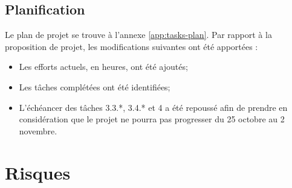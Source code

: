\documentclass[a4paper, oneside, 12pt, titlepage]{article}
\begin{document}
\subsection{Planification}


Le plan de projet se trouve à l'annexe \ref{app:tasks-plan}. Par rapport à la proposition de projet,
les modifications suivantes ont été apportées :

\begin{itemize}
  \item Les efforts actuels, en heures, ont été ajoutés;
  \item Les tâches complétées ont été identifiées;
  \item L'échéancer des tâches 3.3.*, 3.4.* et 4 a été repoussé afin de prendre en considération que
    le projet ne pourra pas progresser du 25 octobre au 2 novembre.
\end{itemize}

\section{Risques}

%
%
\end{document}
